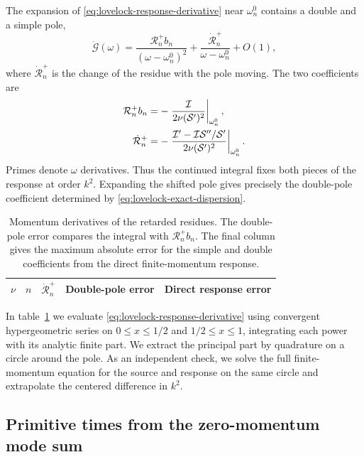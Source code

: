 The expansion of \eqref{eq:lovelock-response-derivative} near
\(\omega_n^0\) contains a double and a simple pole,
\begin{equation}
 \dot{\mathcal G}(\omega)
 =\frac{\mathcal R_n^+ b_n}{(\omega-\omega_n^0)^2}
    +\frac{\dot{\mathcal R}_n^+}{\omega-\omega_n^0}+O(1),
 \label{eq:lovelock-derivative-principal-part}
\end{equation}
where \(\dot{\mathcal R}_n^+\) is the change of the residue
with the pole moving. The two coefficients are
\begin{align}
 \mathcal R_n^+ b_n
 &=-\left.\frac{\mathcal I}{2\nu(\mathcal S')^2}
                \right|_{\omega_n^0},\notag\\
 \dot{\mathcal R}_n^+
 &=-\left.\frac{\mathcal I'-\mathcal I\mathcal S''/\mathcal S'}
                   {2\nu(\mathcal S')^2}\right|_{\omega_n^0}.
 \label{eq:lovelock-residue-derivatives}
\end{align}
Primes denote \(\omega\) derivatives. Thus the continued integral
fixes both pieces of the response at order \(k^2\).
Expanding the shifted pole gives precisely the double-pole
coefficient determined by \eqref{eq:lovelock-exact-dispersion}.

\begin{table}[t]
 \centering\small
 \begin{tabular}{ccccc}
 \hline
 \(\nu\) & \(n\) & \(\dot{\mathcal R}_n^+\) &
 Double-pole error & Direct response error \\
 \hline
 
 \end{tabular}
 \caption{Momentum derivatives of the retarded residues. The
 double-pole error compares the integral with \(\mathcal R_n^+ b_n\).
 The final column gives the maximum absolute error for the
 simple and double coefficients from the direct finite-momentum response.}
 \label{tab:lovelock-residues}
\end{table}

In table~\ref{tab:lovelock-residues} we evaluate
\eqref{eq:lovelock-response-derivative} using convergent
hypergeometric series on \(0\leq x\leq1/2\) and
\(1/2\leq x\leq1\), integrating each power with its
analytic finite part. We extract the principal part by
quadrature on a circle around the pole. As an independent
check, we solve the full finite-momentum equation for the
source and response on the same circle and extrapolate the
centered difference in \(k^2\).

\subsection{Primitive times from the zero-momentum mode sum}

